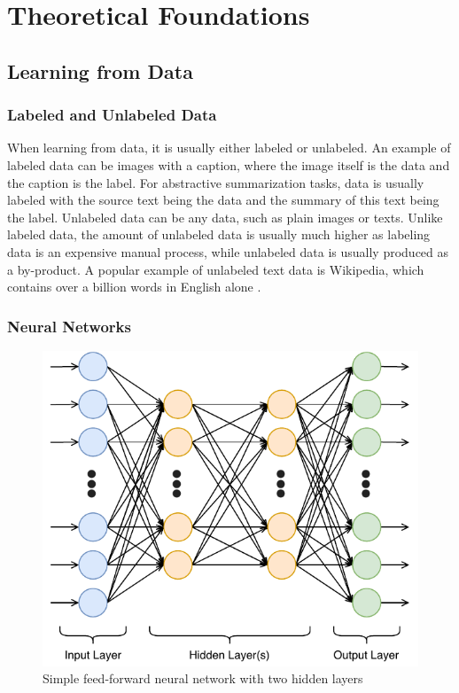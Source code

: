 \chapter{Theoretical Foundations}\label{ch:theoretical-foundations}


\section{Learning from Data}

\subsection{Labeled and Unlabeled Data}

When learning from data, it is usually either labeled or unlabeled.
An example of labeled data can be images with a caption, where the image itself is the data and the caption is the label.
For abstractive summarization tasks, data is usually labeled with the source text being the data and the summary of this text being the label.
Unlabeled data can be any data, such as plain images or texts.
Unlike labeled data, the amount of unlabeled data is usually much higher as labeling data is an expensive manual process, while unlabeled data is usually produced as a by-product.
A popular example of unlabeled text data is Wikipedia, which contains over a billion words in English alone \cite{wikipediaStats}. 


\subsection{Neural Networks}

\begin{figure}[h]
\centering
\includegraphics[width=0.45\paperwidth]{figures/neural-network}
\caption{Simple feed-forward neural network with two hidden layers}
\label{fig:neural-network}
\end{figure}


